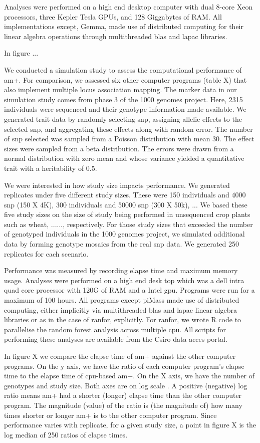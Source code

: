 \documentclass[12pt]{article}
\begin{document}
Analyses were performed on a high end desktop computer with dual 8-core Xeon processors, three Kepler Tesla GPUs, and 128 Giggabytes of RAM. 
All implementations except, Gemma, made use of distributed computing for their linear algebra operations through multithreaded blas and lapac libraries.

In figure ...



We conducted a simulation study to assess  the computational performance of am+. For comparison, we assessed six other computer programs (table X) that  also implement multiple locus association mapping. The marker data in our simulation study comes from phase 3 of the 1000 genomes project. Here, 2315 individuals were sequenced and their genotype information made available. We generated trait data by randomly selecting snp, assigning allelic  effects to the selected snp, and aggregating these effects along with random error. The number of snp  selected  was sampled from a Poisson distribution with mean 30. The effect sizes were sampled from a beta distribution. The errors were drawn from a normal distribution with zero mean and whose variance yielded a quantitative trait with a heritability of 0.5.


We were interested in how study size impacts performance. We generated replicates under five different study sizes. These were 150 individuals and 4000 snp (150 X 4K), 300 individuals and 50000 snp (300 X 50k), ... We based these five study sizes on the size of study being performed in unsequenced crop plants such as wheat, ......, respectively. For those study sizes that exceeded the number of genotyped individuals in the 1000 genomes project,  we simulated additional data by forming genotype mosaics from the real snp data. We generated 250 replicates for each scenario. 

Performance was measured by recording elapse  time and maximum memory usage. Analyses were performed on a high end desk top which was a dell intra quad core processor with 120G of RAM and a Intel gpu. Programs were run for a maximum of 100 hours.  All programs except piMass  made use of distributed computing, either implicitly via multithreaded blas and lapac linear algebra libraries or as in the case of ranfor, explicitly. For ranfor, we wrote R code to parallelise the random forest analysis across multiple cpu.  All scripts for performing these analyses are available from the Csiro-data acces portal.

In figure X we compare the elapse time of  am+ against the other computer programs. On the y axis, we have the ratio of each computer program's elapse time to the elapse time of cpu-based am+. On the X axis, we have the number of genotypes and study size. Both axes are on log scale . A positive (negative) log ratio means am+ had a shorter (longer) elapse time  than the other computer program. The magnitude (value) of the ratio is (the magnitude of)  how many times shorter or longer am+ is to the other computer program.  Since performance varies with replicate, for a given study size, a point in figure X is the log median of 250  ratios of elapse times.
\end{document}
